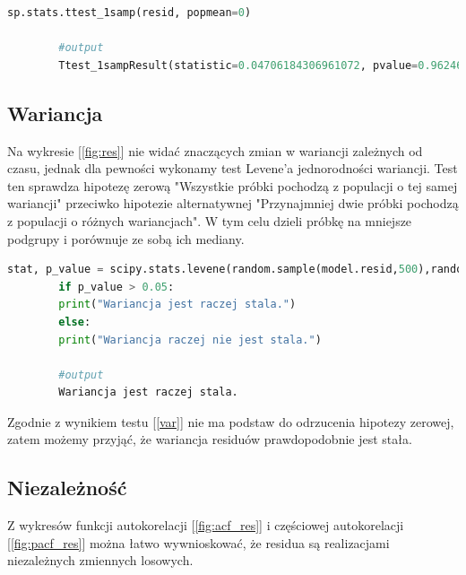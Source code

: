 \documentclass{article}
\theoremstyle{break}
\begin{document}
	\begin{lstlisting}[language=Python, caption=Test t, label={srednia}]
		sp.stats.ttest_1samp(resid, popmean=0)
		
		#output
		Ttest_1sampResult(statistic=0.04706184306961072, pvalue=0.9624674462497231)\end{lstlisting}
	
	\subsection{Wariancja}
	Na wykresie [\ref{fig:res}] nie widać znaczących zmian w wariancji zależnych od czasu, jednak dla pewności wykonamy test Levene'a jednorodności wariancji. Test ten sprawdza hipotezę zerową "Wszystkie próbki pochodzą z populacji o tej samej wariancji" przeciwko hipotezie alternatywnej "Przynajmniej dwie próbki pochodzą z populacji o różnych wariancjach". W tym celu dzieli próbkę na mniejsze podgrupy i porównuje ze sobą ich mediany.
	
	\begin{lstlisting}[language=Python, caption=Test Levene'a, label={var}]
		stat, p_value = scipy.stats.levene(random.sample(model.resid,500),random.sample(model.resid,500))
		if p_value > 0.05:
		print("Wariancja jest raczej stala.")
		else:
		print("Wariancja raczej nie jest stala.")
		
		#output
		Wariancja jest raczej stala.\end{lstlisting}
	
	Zgodnie z wynikiem testu [\ref{var}] nie ma podstaw do odrzucenia hipotezy zerowej, zatem możemy przyjąć, że wariancja residuów prawdopodobnie jest stała.
	
	\subsection{Niezależność}
	Z wykresów funkcji autokorelacji [\ref{fig:acf_res}] i częściowej autokorelacji [\ref{fig:pacf_res}] można łatwo wywnioskować, że residua są realizacjami niezależnych zmiennych losowych.
	
\end{document}
